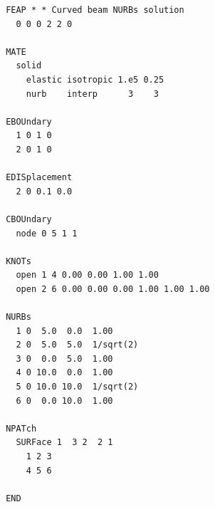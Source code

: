 \begin{table}[!t]
\setlength{\baselineskip}{12pt}
\begin{verbatim}
       FEAP * * Curved beam NURBs solution
         0 0 0 2 2 0

       MATE
         solid
           elastic isotropic 1.e5 0.25
           nurb    interp      3    3

       EBOUndary
         1 0 1 0
         2 0 1 0

       EDISplacement
         2 0 0.1 0.0

       CBOUndary
         node 0 5 1 1

       KNOTs
         open 1 4 0.00 0.00 1.00 1.00
         open 2 6 0.00 0.00 0.00 1.00 1.00 1.00

       NURBs
         1 0  5.0  0.0  1.00
         2 0  5.0  5.0  1/sqrt(2)
         3 0  0.0  5.0  1.00
         4 0 10.0  0.0  1.00
         5 0 10.0 10.0  1/sqrt(2)
         6 0  0.0 10.0  1.00
          
       NPATch
         SURFace 1  3 2  2 1 
           1 2 3
           4 5 6

       END
\end{verbatim}
\setlength{\baselineskip}{14pt}
\caption{Input data for 2-d curved beam. \label{tab1}}
\end{table}
